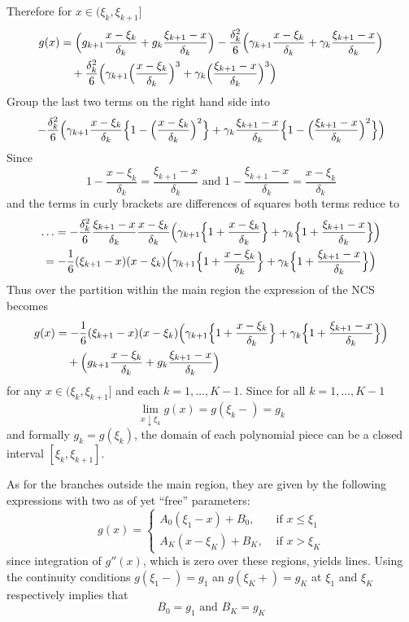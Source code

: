 \documentclass[a4paper]{article}
\begin{document}
Therefore for $x\in (\xi_k,\xi_{k+1}]$
\begin{align*}
g(x) &= \Bigl( g_{k+1} \frac{x - \xi_k}{\delta_k} + g_k \frac{\xi_{k+1}-x}{\delta_k} \Bigr)
	- \frac{\delta_k^2}{6} \Bigl( \gamma_{k+1} \frac{x - \xi_k}{\delta_k} + \gamma_k \frac{\xi_{k+1}-x}{\delta_k} \Bigr)\\
	&\quad+ \frac{\delta_k^2}{6} \Bigl( \gamma_{k+1}\Bigl(\frac{x-\xi_k}{\delta_k}\Bigr)^3+\gamma_k\Bigl(\frac{\xi_{k+1}-x}{\delta_k}\Bigr)^3\Bigr)
\end{align*}
Group the last two terms on the right hand side into
\[
- \frac{\delta_k^2}{6} \Bigl(
	\gamma_{k+1}\frac{x - \xi_k}{\delta_k} \Bigl\{1-\Bigl(\frac{x-\xi_k}{\delta_k}\Bigr)^2\Bigr\}
	+\gamma_k\frac{\xi_{k+1}-x}{\delta_k} \Bigl\{1-\Bigl(\frac{\xi_{k+1}-x}{\delta_k}\Bigr)^2\Bigr\}
\Bigr)
\]
Since 
\[
1-\frac{x-\xi_k}{\delta_k} = \frac{\xi_{k+1}-x}{\delta_k }
\text{ and }
1-\frac{\xi_{k+1}-x}{\delta_k} = \frac{x-\xi_k}{\delta_k }
\]
and the terms in curly brackets are differences of squares both terms reduce to
\begin{multline*}
\ldots = - \frac{\delta_k^2 }{6} \frac{\xi_{k+1}-x}{\delta_k} \frac{x-\xi_k}{\delta_k} \Bigl(
		\gamma_{k+1}\Bigl\{1+\frac{x-\xi_k}{\delta_k}\Bigr\}
		+ \gamma_k\Bigl\{1+\frac{\xi_{k+1}-x}{\delta_k}\Bigr\}
	\Bigr)\\
= - \frac{1}{6} (\xi_{k+1}-x)(x-\xi_k) \Bigl(
	\gamma_{k+1}\Bigl\{1+\frac{x-\xi_k}{\delta_k}\Bigr\}
	+\gamma_k\Bigl\{1+\frac{\xi_{k+1}-x}{\delta_k}\Bigr\}
\Bigr)
\end{multline*}
Thus over the partition within the main region the expression of the NCS becomes
\begin{align*}
g(x) &= - \frac{1}{6} (\xi_{k+1}-x)(x-\xi_k) \Bigl(
		\gamma_{k+1}\Bigl\{1+\frac{x-\xi_k}{\delta_k}\Bigr\}
		+\gamma_k\Bigl\{1+\frac{\xi_{k+1}-x}{\delta_k}\Bigr\}
	\Bigr)\\
	&\quad +\Bigl( g_{k+1} \frac{x - \xi_k}{\delta_k} + g_k \frac{\xi_{k+1}-x}{\delta_k} \Bigr)
\end{align*}
for any $x\in(\xi_k, \xi_{k+1}]$ and each $k=1,\ldots, K-1$. Since for all $k=1,\ldots, K-1$
\[\lim_{x\downarrow\xi_k} g(x) = g(\xi_k-) = g_k\]
and formally $g_k = g(\xi_k)$, the domain of each polynomial piece can be a closed
interval $[\xi_k, \xi_{k+1}]$.

As for the branches outside the main region, they are given by the following
expressions with two as of yet ``free'' parameters:
\[g(x) = \begin{cases}
	A_0(\xi_1-x)+B_0, &\text{ if }x\leq \xi_1\\
	A_K(x-\xi_K)+B_K, &\text{ if }x > \xi_K
\end{cases}\]
since integration of $g''(x)$, which is zero over these regions, yields lines. Using
the continuity conditions $g(\xi_1-)=g_1$ an $g(\xi_K+)=g_K$ at $\xi_1$ and $\xi_K$
respectively implies that
\[B_0 = g_1\text{ and }B_K = g_K\]
\end{document}
